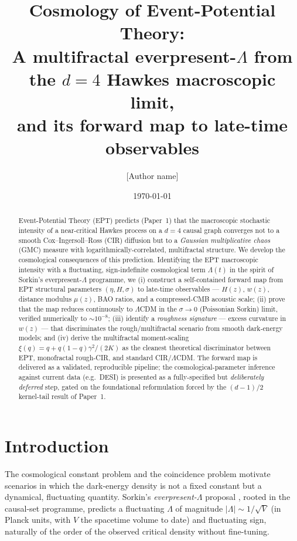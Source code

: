 \documentclass[11pt,a4paper]{article}
\title{Cosmology of Event-Potential Theory:\\
A multifractal everpresent-$\Lambda$ from the $d=4$ Hawkes macroscopic limit,\\
and its forward map to late-time observables}
\author{[Author name]\\ [Affiliation]}
\date{\today}
\begin{document}
\maketitle

\begin{abstract}
Event-Potential Theory (EPT) predicts (Paper~1) that the macroscopic stochastic intensity of a near-critical Hawkes process on a $d=4$ causal graph converges not to a smooth Cox--Ingersoll--Ross (CIR) diffusion but to a \emph{Gaussian multiplicative chaos} (GMC) measure with logarithmically-correlated, multifractal structure. We develop the cosmological consequences of this prediction. Identifying the EPT macroscopic intensity with a fluctuating, sign-indefinite cosmological term $\Lambda(t)$ in the spirit of Sorkin's everpresent-$\Lambda$ programme, we (i) construct a self-contained forward map from EPT structural parameters $(\eta, H, \sigma)$ to late-time observables --- $H(z)$, $w(z)$, distance modulus $\mu(z)$, BAO ratios, and a compressed-CMB acoustic scale; (ii) prove that the map reduces continuously to $\Lambda$CDM in the $\sigma \to 0$ (Poissonian Sorkin) limit, verified numerically to $\sim 10^{-8}$; (iii) identify a \emph{roughness signature} --- excess curvature in $w(z)$ --- that discriminates the rough/multifractal scenario from smooth dark-energy models; and (iv) derive the multifractal moment-scaling $\xi(q)=q+q(1-q)\gamma^2/(2K)$ as the cleanest theoretical discriminator between EPT, monofractal rough-CIR, and standard CIR/$\Lambda$CDM. The forward map is delivered as a validated, reproducible pipeline; the cosmological-parameter inference against current data (e.g.\ DESI) is presented as a fully-specified but \emph{deliberately deferred} step, gated on the foundational reformulation forced by the $(d-1)/2$ kernel-tail result of Paper~1.
\end{abstract}

\section{Introduction}

The cosmological constant problem and the coincidence problem motivate scenarios in which the dark-energy density is not a fixed constant but a dynamical, fluctuating quantity. Sorkin's \emph{everpresent-$\Lambda$} proposal \cite{Sorkin1997,Ahmed2004}, rooted in the causal-set programme, predicts a fluctuating $\Lambda$ of magnitude $|\Lambda| \sim 1/\sqrt{V}$ (in Planck units, with $V$ the spacetime volume to date) and fluctuating sign, naturally of the order of the observed critical density without fine-tuning.
\end{document}
